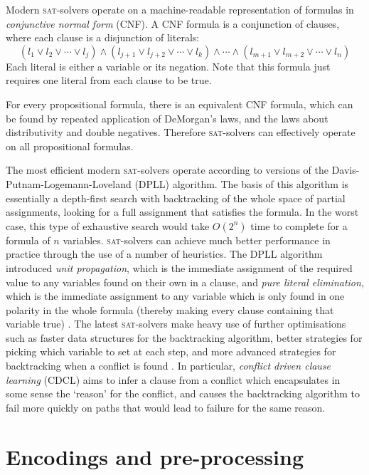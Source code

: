 \documentclass[11pt]{article}
\newcommand{\sat}{\textsc{sat}}
\begin{document}
Modern \sat{}-solvers operate on a machine-readable representation of formulas in \emph{conjunctive normal form} (CNF). A CNF formula is a conjunction of clauses, where each clause is a disjunction of literals:
\[(l_1 \vee l_2 \vee \cdots \vee l_j) \wedge (l_{j+1} \vee l_{j+2} \vee \cdots \vee l_k) \wedge \cdots \wedge (l_{m+1} \vee l_{m+2} \vee \cdots \vee l_n)\]
Each literal is either a variable or its negation. Note that this formula just requires one literal from each clause to be true.

For every propositional formula, there is an equivalent CNF formula, which can be found by repeated application of DeMorgan's laws, and the laws about distributivity and double negatives. Therefore \sat{}-solvers can effectively operate on all propositional formulas.

The most efficient modern \sat{}-solvers operate according to versions of the Davis-Putnam-Logemann-Loveland (DPLL) algorithm. The basis of this algorithm is essentially a depth-first search with backtracking of the whole space of partial assignments, looking for a full assignment that satisfies the formula. In the worst case, this type of exhaustive search would take $O(2^n)$ time to complete for a formula of $n$ variables. \sat{}-solvers can achieve much better performance in practice through the use of a number of heuristics. The DPLL algorithm introduced \emph{unit propagation}, which is the immediate assignment of the required value to any variables found on their own in a clause, and \emph{pure literal elimination}, which is the immediate assignment to any variable which is only found in one polarity in the whole formula (thereby making every clause containing that variable true) \cite{Davis:1962}. The latest \sat{}-solvers make heavy use of further optimisations such as faster data structures for the backtracking algorithm, better strategies for picking which variable to set at each step, and more advanced strategies for backtracking when a conflict is found \cite{Een:2003}. In particular, \emph{conflict driven clause learning} (CDCL) aims to infer a clause from a conflict which encapsulates in some sense the `reason' for the conflict, and causes the backtracking algorithm to fail more quickly on paths that would lead to failure for the same reason.

\section{Encodings and pre-processing}
\end{document}
